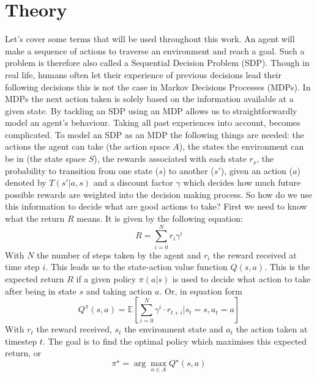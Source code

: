 \documentclass{article}
\theoremstyle{plain}
\theoremstyle{definition}
\theoremstyle{remark}
\begin{document}
\section{Theory}\label{sec:theory}
Let's cover some terms that will be used throughout this work. An agent will make a sequence of actions to traverse an environment and reach a goal. Such a problem is therefore also called a Sequential Decision Problem (SDP). Though in real life, humans often let their experience of previous decisions lead their following decisions this is not the case in Markov Decisions Processes (MDPs). In MDPs the next action taken is solely based on the information available at a given state. By tackling an SDP using an MDP allows us to straightforwardly model an agent's behaviour. Taking all past experiences into account, becomes complicated. To model an SDP as an MDP the following things are needed: the actions the agent can take (the action space $A$), the states the environment can be in (the state space $S$), the rewards associated with each state $r_s$, the probability to transition from one state ($s$) to another ($s'$), given an action ($a$) denoted by $T(s'|a,s)$ and a discount factor $\gamma$ which decides how much future possible rewards are weighted into the decision making process. So how do we use this information to decide what are good actions to take? First we need to know what the return $R$ means. It is given by the following equation:
\begin{equation}
    R = \sum_{i=0}^N r_i \gamma^i
    \label{eq:return}
\end{equation}
With $N$ the number of steps taken by the agent and $r_i$ the reward received at time step $i$. This leads us to the state-action value function $Q(s,a)$. This is the expected return $R$ if a given policy $\pi(a|s)$ is used to decide what action to take after being in state $s$ and taking action $a$. Or, in equation form
\begin{equation}
    Q^\pi(s,a) = \mathds{E}\left[\sum_{i=0}^N\gamma^i \cdot r_{t+i}|s_t=s,a_t=a\right]
    \label{eq:state_action_value}
\end{equation}
With $r_t$ the reward received, $s_t$ the environment state and $a_t$ the action taken at timestep $t$. The goal is to find the optimal policy which maximises this expected return, or
\begin{equation}
    \pi^\star = \arg\max_{a\in A} Q^\star(s,a)
    \label{eq:RL_goal}
\end{equation}
\end{document}
